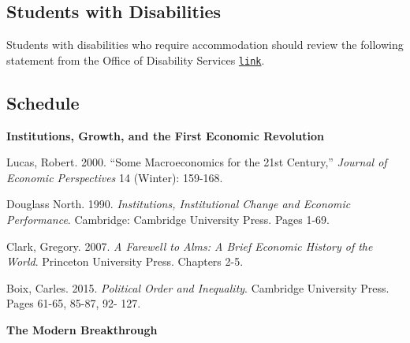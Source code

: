 \documentclass[letterpaper]{article}
\renewenvironment{itemize}{
  \begin{list}{}{
    \setlength{\leftmargin}{1.5em}
  }
}{
  \end{list}
}
\begin{document}
\subsection*{Students with Disabilities}
Students with disabilities who require accommodation should review the following statement from the Office of Disability Services \href{https://ods.rutgers.edu/faculty/syllabus}{\texttt{link}}.



\subsection*{Schedule}

\begin{enumerate}

\item {\bf Institutions, Growth, and the First Economic Revolution}
	\begin{itemize}
		\item[$\bullet$] Lucas, Robert. 2000. ``Some Macroeconomics for the 21st Century,'' \emph{Journal of Economic Perspectives} 14 (Winter): 159-168.
		\item[$\bullet$]Douglass North. 1990. \emph{Institutions, Institutional Change and Economic Performance}. Cambridge: Cambridge University Press. Pages 1-69.
		\item[$\bullet$]Clark, Gregory. 2007. \emph{A Farewell to Alms: A Brief Economic History of the World}. Princeton University Press. Chapters 2-5.
		\item[$\bullet$]Boix, Carles. 2015. \emph{Political Order and Inequality}. Cambridge University Press. Pages 61-65, 85-87, 92- 127.
	\end{itemize}


\item {\bf The Modern Breakthrough}


\end{enumerate}
\end{document}
